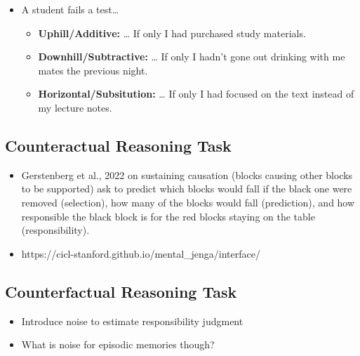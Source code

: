 \documentclass[
  .7em,
  letterpaper,
  DIV=11,
  numbers=noendperiod]{scrartcl}
\begin{document}
\begin{itemize}
\item
  A student fails a test\ldots{}

  \begin{itemize}
  \item
    \textbf{Uphill/Additive:} \ldots{} If only I had purchased study
    materials.
  \item
    \textbf{Downhill/Subtractive:} \ldots{} If only I hadn't gone out
    drinking with me mates the previous night.
  \item
    \textbf{Horizontal/Subsitution:} \ldots{} If only I had focused on
    the text instead of my lecture notes.
  \end{itemize}
\end{itemize}

\hypertarget{counteractual-reasoning-task}{%
\subsection{Counteractual Reasoning
Task}\label{counteractual-reasoning-task}}

\begin{itemize}
\item
  Gerstenberg et al., 2022 on sustaining causation (blocks causing other
  blocks to be supported) ask to predict which blocks would fall if the
  black one were removed (selection), how many of the blocks would fall
  (prediction), and how responsible the black block is for the red
  blocks staying on the table (responsibility).
\item
  https://cicl-stanford.github.io/mental\_jenga/interface/
\end{itemize}

\hypertarget{counterfactual-reasoning-task}{%
\subsection{Counterfactual Reasoning
Task}\label{counterfactual-reasoning-task}}

\begin{itemize}
\item
  Introduce noise to estimate responsibility judgment
\item
  What is noise for episodic memories though?
\end{itemize}
\end{document}
